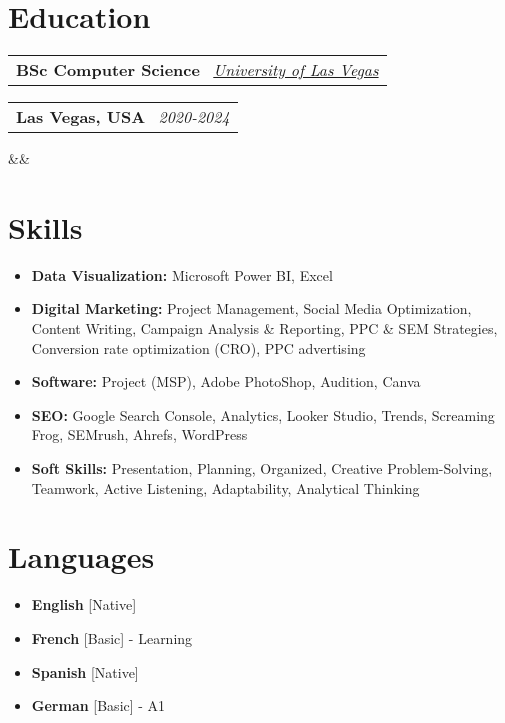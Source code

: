 \documentclass[11pt,a4paper,sans]{moderncv}
\makeatletter
\newcommand*{\customcventry}[7][.13em]{
\begin{tabular}{@{}l}
{\bfseries #4} \
{\itshape #3}
\end{tabular}
\hfill
\begin{tabular}{l@{}}
{\bfseries #5} \
{\itshape #2}
\end{tabular}
\ifx&#7&%
\else{\
\begin{minipage}{\maincolumnwidth}%
\small#7%
\end{minipage}}\fi%
\par\addvspace{#1}}
\makeatother
\begin{document}
\section{Education}
\customcventry{2020-2024}{\color{blue}\href{https://www.google.com/}{University of Las Vegas}}{BSc Computer Science}{Las Vegas, USA}{}{}{Relevant Courses: Software and Hardware, Data Visualization, Business Intelligence, Digital Marketing, Time Series Analysis \& Forecasting.}

\section{Skills}
{\begin{itemize}[label=\textbullet]
\item {\textbf{Data Visualization:} Microsoft Power BI, Excel}
\item {\textbf{Digital Marketing:} Project Management, Social Media Optimization, Content Writing, Campaign Analysis \& Reporting, PPC \& SEM Strategies, Conversion rate optimization (CRO), PPC advertising}
\item {\textbf{Software:} Project (MSP), Adobe PhotoShop, Audition, Canva}
\item {\textbf{SEO:} Google Search Console, Analytics, Looker Studio, Trends, Screaming Frog, SEMrush, Ahrefs, WordPress}
\item {\textbf{Soft Skills:} Presentation, Planning, Organized, Creative Problem-Solving, Teamwork, Active Listening, Adaptability, Analytical Thinking}
\end{itemize}}

\section{Languages}
\begin{multicols}{2}
    \begin{itemize}[label=\textbullet]
    \item \textbf{English} [Native]
    \item {\textbf{French} [Basic] - Learning}
    \item {\textbf{Spanish} [Native]}
    \item {\textbf{German} [Basic] - A1}
    \end{itemize}
\end{multicols}
\end{document}
